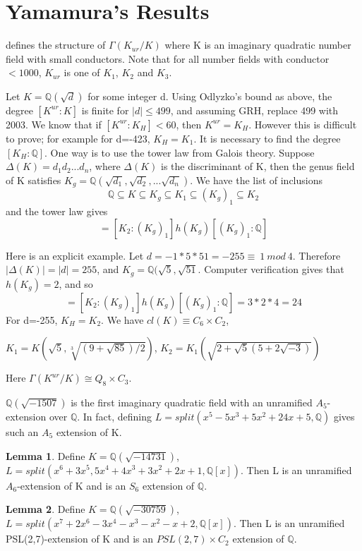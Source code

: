 \documentclass[12pt]{extarticle}
\newcommand{\murgg}{\Gamma(K^{ur}/K)}
\newcommand{\Q}{\mathbb{Q}}
\newcommand{\<}{\langle}
\renewcommand{\>}{\rangle}
\theoremstyle{definition}
\newtheorem{lemma}{Lemma}
\begin{document}
\section{Yamamura's Results}
\cite{} defines the structure of $\Gamma(K_{ur}/K)$ where K is an imaginary quadratic number field with small conductors. Note that for all number fields with conductor $<1000$, $K_{ur}$ is one of $K_1$, $K_2$ and $K_3$. \par 
Let $K=\Q(\sqrt{d})$ for some integer d. Using Odlyzko's bound as above, the degree $[K^{ur}:K]$ is finite for $|d|\leq 499$, and assuming GRH, replace 499 with 2003. We know that if $[K^{ur}:K_H]<60$, then $K^{ur}=K_H$. However this is difficult to prove; for example for d=-423, $K_H=K_1$. It is necessary to find the degree $[K_H:\Q]$. One way is to use the tower law from Galois theory. Suppose $\Delta(K)=d_1d_2...d_n$, where $\Delta(K)$ is the discriminant of K, then the genus field of K satisfies $K_g=\Q(\sqrt{d_1},\sqrt{d_2},...\sqrt{d_n})$. We have the list of inclusions \begin{equation}
    \Q \subseteq K \subseteq K_g \subseteq K_1 \subseteq (K_g)_1 \subseteq K_2
\end{equation} and the tower law gives \begin{equation}
    [K_2:q] = [K_2:(K_g)_1]h(K_g)[(K_g)_1:\Q]
\end{equation}\par
Here is an explicit example. Let  $d=-1*5*51=-255\equiv \: 1\:mod\:4$. Therefore $|\Delta(K)|=|d|=255$, and $K_g = \Q(\sqrt{5},\sqrt{51}$. Computer verification gives that $h(K_g)=2$, and so \begin{equation}
     [K_2:\Q] = [K_2:(K_g)_1]h(K_g)[(K_g)_1:\Q]= 3*2*4=24
\end{equation}
For d=-255, $K_H=K_2$. We have $cl(K)\equiv C_6 \times C_2$, 

$K_1 = K \left( 
\sqrt{5}, \sqrt[3]{(9+\sqrt{85})/2}
\right)$, $K_2 = K_1 \left( 
\sqrt{2+\sqrt{5}(5+2\sqrt{-3})}
\right)$

 Here $\murgg \cong Q_8 \times C_3$.
\par
$\mathbb{Q}(\sqrt{-1507})$ is the first imaginary quadratic field with an unramified $A_5$-extension over $\mathbb{Q}$. In fact, defining $L=split\left( x^5-5x^3+5x^2+24x+5,\Q\right)$ gives such an $A_5$ extension of K. 
\begin{lemma}
Define $K=\mathbb{Q}(\sqrt{-14731})$, $L=split(x^6+3x^5,5x^4+4x^3+3x^2+2x+1,\mathbb{Q}[x])$. Then L is an unramified $A_6$-extension of K and is an $S_6$ extension of $\mathbb{Q}$.
\end{lemma}
\begin{lemma}
Define $K=\mathbb{Q}(\sqrt{-30759})$, $L=split(x^7+2x^6-3x^4-x^3-x^2-x+2,\mathbb{Q}[x])$. Then L is an unramified PSL(2,7)-extension of K and is an $PSL(2,7)\times C_2$ extension of $\mathbb{Q}$.
\end{lemma}
\end{document}

